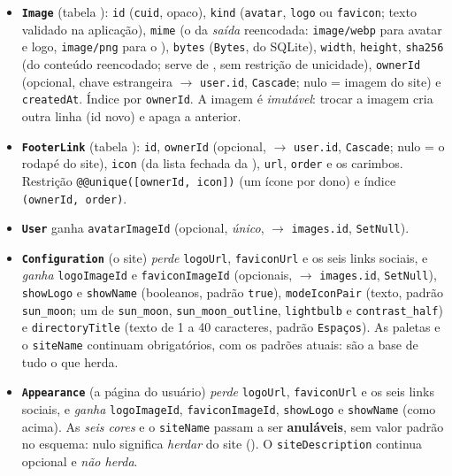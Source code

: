 \begin{itemize}
  \item \textbf{\texttt{Image}} (tabela ): \texttt{id} (\texttt{cuid}, opaco), \texttt{kind} (\texttt{avatar}, \texttt{logo} ou \texttt{favicon}; texto validado na aplicação), \texttt{mime} (o da \emph{saída} reencodada: \texttt{image/webp} para avatar e logo, \texttt{image/png} para o ), \texttt{bytes} (\texttt{Bytes},  do SQLite), \texttt{width}, \texttt{height}, \texttt{sha256} (do conteúdo reencodado; serve de , sem restrição de unicidade), \texttt{ownerId} (opcional, chave estrangeira $\rightarrow$ \texttt{user.id}, \texttt{Cascade}; nulo = imagem do site) e \texttt{createdAt}. Índice por \texttt{ownerId}. A imagem é \emph{imutável}: trocar a imagem cria outra linha (id novo) e apaga a anterior.
  \item \textbf{\texttt{FooterLink}} (tabela ): \texttt{id}, \texttt{ownerId} (opcional, $\rightarrow$ \texttt{user.id}, \texttt{Cascade}; nulo = o rodapé do site), \texttt{icon} (da lista fechada da ), \texttt{url}, \texttt{order} e os carimbos. Restrição \texttt{@@unique([ownerId, icon])} (um ícone por dono) e índice \texttt{(ownerId, order)}.
  \item \textbf{\texttt{User}} ganha \texttt{avatarImageId} (opcional, \emph{único}, $\rightarrow$ \texttt{images.id}, \texttt{SetNull}).
  \item \textbf{\texttt{Configuration}} (o site) \emph{perde} \texttt{logoUrl}, \texttt{faviconUrl} e os seis links sociais, e \emph{ganha} \texttt{logoImageId} e \texttt{faviconImageId} (opcionais, $\rightarrow$ \texttt{images.id}, \texttt{SetNull}), \texttt{showLogo} e \texttt{showName} (booleanos, padrão \texttt{true}), \texttt{modeIconPair} (texto, padrão \texttt{sun\_moon}; um de \texttt{sun\_moon}, \texttt{sun\_moon\_outline}, \texttt{lightbulb} e \texttt{contrast\_half}) e \texttt{directoryTitle} (texto de 1 a 40 caracteres, padrão \texttt{Espaços}). As paletas e o \texttt{siteName} continuam obrigatórios, com os padrões atuais: são a base de tudo o que herda.
  \item \textbf{\texttt{Appearance}} (a página do usuário) \emph{perde} \texttt{logoUrl}, \texttt{faviconUrl} e os seis links sociais, e \emph{ganha} \texttt{logoImageId}, \texttt{faviconImageId}, \texttt{showLogo} e \texttt{showName} (como acima). As \emph{seis cores} e o \texttt{siteName} passam a ser \textbf{anuláveis}, sem valor padrão no esquema: nulo significa \emph{herdar} do site (). O \texttt{siteDescription} continua opcional e \emph{não herda}.
\end{itemize}

